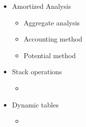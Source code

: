 \begin{itemize}
  \item Amortized Analysis
  \begin{itemize}
    \item Aggregate analysis
    \item Accounting method
    \item Potential method
  \end{itemize}
  \item Stack operations
  \begin{itemize}
    \item
  \end{itemize}
  \item Dynamic tables
  \begin{itemize}
    \item 
  \end{itemize}
\end{itemize}

